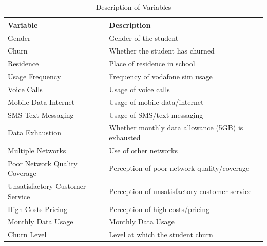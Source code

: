 \documentclass[doublespacing]{report} [12px]%
\begin{document}
\begin{table}[H]
    \centering
    \begin{tabular}{ll}
        \toprule
        \textbf{Variable}& \textbf{Description} \\
        \midrule
        Gender & Gender of the student\\
        Churn & Whether the student has churned\\
        Residence & Place of residence in school\\
        Usage Frequency & Frequency of vodafone sim usage\\
        Voice Calls & Usage of voice calls \\
        Mobile Data Internet & Usage of mobile data/internet \\
        SMS Text Messaging & Usage of SMS/text messaging \\
        Data Exhaustion & Whether monthly data allowance (5GB) is exhausted\\
        Multiple Networks & Use of other networks \\
        Poor Network Quality Coverage & Perception of poor network quality/coverage \\
        Unsatisfactory Customer Service & Perception of unsatisfactory customer service \\
        High Costs Pricing & Perception of high costs/pricing \\
        Monthly Data Usage & Monthly Data Usage\\
        Churn Level & Level at which the student churn\\
        \bottomrule
    \end{tabular}
    \caption{Description of Variables}
    \label{tab: 4.1}
\end{table}
\end{document}
